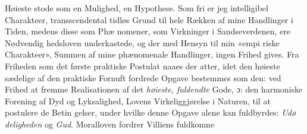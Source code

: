 \documentclass[12pt,a4paper]{book}
\begin{document}
Høieste stode som en Mulighed, en Hypothese. Som fri er jeg
intelligibel Charakteer, transscendental tidløs Grund til hele
Rækken af mine Handlinger i Tiden, medens disse som Phæ\-%
nomener, som Virkninger i Sandseverdenen, ere Nødvendig\-%
hedsloven underkastede, og der med Hensyn til min «empi\-%
riske Charakteer», Summen af mine phænomenale Handlinger,
ingen Frihed gives. Fra Friheden som det første praktiske
Postulat naaes der atter, idet den høieste sædelige af den
praktiske Fornuft fordrede Opgave bestemmes som den: ved
Frihed at fremme Realisationen af det \emph{høieste, fuldendte}
Gode, ɔ: den harmoniske Forening af Dyd og Lyksalighed,
Lovens Virkeliggjørelse i Naturen, til at postulere de Betin\-%
gelser, under hvilke denne Opgave alene kan fuldbyrdes: \emph{Udø\-%
deligheden} og \emph{Gud}. Moralloven fordrer Villiens fuldkomne
\end{document}
